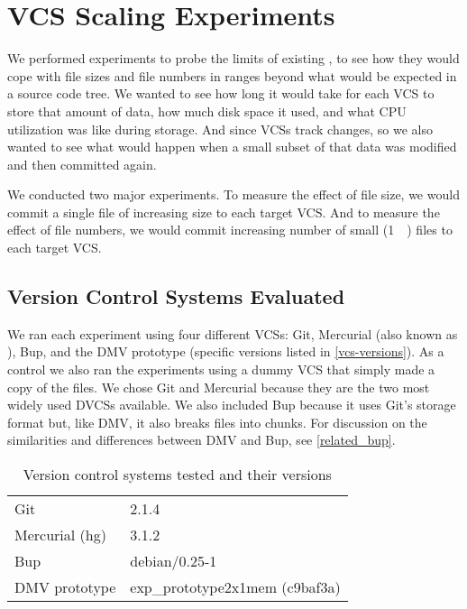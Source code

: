 \chapter{VCS Scaling Experiments}
\label{num-files-exp-desc}
\label{file-size-exp-desc}


We performed experiments to probe the limits of existing , to see
how they would cope with file sizes and file numbers in ranges beyond what would
be expected in a source code tree. We wanted to see how long it would take for
each \gls{VCS} to store that amount of data, how much disk space it used, and
what CPU utilization was like during storage. And since \glspl{VCS} track
changes, so we also wanted to see what would happen when a small subset of that
data was modified and then committed again.

We conducted two major experiments. To measure the effect of file size, we would
\gls{commit} a single file of increasing size to each target \gls{VCS}. And to
measure the effect of file numbers, we would \gls{commit} increasing number of
small (\SI{1}{\kibi\byte}) files to each target \gls{VCS}.



\section{Version Control Systems Evaluated}

We ran each experiment using four different \glspl{VCS}: Git, Mercurial (also
known as ), Bup, and the \gls{DMV} prototype (specific versions
listed in \autoref{vcs-versions}). As a control we also ran the experiments
using a dummy \gls{VCS} that simply made a copy of the files. We chose Git and
Mercurial because they are the two most widely used \glspl{DVCS} available. We
also included Bup because it uses Git's storage format but, like \gls{DMV}, it
also breaks files into chunks. For discussion on the similarities and
differences between \gls{DMV} and Bup, see \autoref{related_bup}.


\begin{table}
    \caption{Version control systems tested and their versions}
    \label{vcs-versions}
    \centering
    \begin{tabular}{ l l }
        Git & 2.1.4 \\
        Mercurial (hg) & 3.1.2 \\
        Bup & debian/0.25-1 \\
        DMV prototype & exp\_prototype2x1mem (c9baf3a) \\
    \end{tabular}
\end{table}


